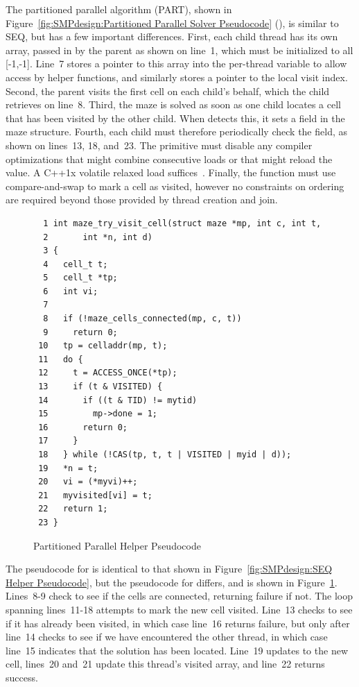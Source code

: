 The partitioned parallel algorithm (PART), shown in
Figure~\ref{fig:SMPdesign:Partitioned Parallel Solver Pseudocode}
(),
is similar to SEQ, but has a few important differences.
First, each child thread has its own  array, passed in by
the parent as shown on line~1,
which must be initialized to all [-1,-1].
Line~7 stores a pointer to this array into the per-thread variable
 to allow access by helper functions, and similarly stores
a pointer to the local visit index.
Second, the parent visits the first cell on each child's behalf,
which the child retrieves on line~8.
Third, the maze is solved as soon as one child locates a cell that has
been visited by the other child.
When  detects this,
it sets a  field in the maze structure.
Fourth, each child must therefore periodically check the 
field, as shown on lines~13, 18, and~23.
The  primitive must disable any compiler
optimizations that might combine consecutive loads or that
might reload the value.
A C++1x volatile relaxed load suffices~\cite{PeteBecker2011N3242}.
Finally, the  function must use
compare-and-swap to mark a cell as visited, however
no constraints on ordering are required beyond those provided by
thread creation and join.

\begin{figure}[tbp]
{ \scriptsize
\begin{verbatim}
  1 int maze_try_visit_cell(struct maze *mp, int c, int t,
  2       int *n, int d)
  3 {
  4   cell_t t;
  5   cell_t *tp;
  6   int vi;
  7 
  8   if (!maze_cells_connected(mp, c, t))
  9     return 0;
 10   tp = celladdr(mp, t);
 11   do {
 12     t = ACCESS_ONCE(*tp);
 13     if (t & VISITED) {
 14       if ((t & TID) != mytid)
 15         mp->done = 1;
 16       return 0;
 17     }
 18   } while (!CAS(tp, t, t | VISITED | myid | d));
 19   *n = t;
 20   vi = (*myvi)++;
 21   myvisited[vi] = t;
 22   return 1;
 23 }
\end{verbatim}
}
\caption{Partitioned Parallel Helper Pseudocode}
\label{fig:SMPdesign:Partitioned Parallel Helper Pseudocode}
\end{figure}

The pseudocode for  is identical to that shown in
Figure~\ref{fig:SMPdesign:SEQ Helper Pseudocode},
but the pseudocode for  differs, and
is shown in
Figure~\ref{fig:SMPdesign:Partitioned Parallel Helper Pseudocode}.
Lines~8-9 check to see if the cells are connected, returning failure
if not.
The loop spanning lines~11-18 attempts to mark the new cell visited.
Line~13 checks to see if it has already been visited, in which case
line~16 returns failure, but only after line~14 checks to see if
we have encountered the other thread, in which case line~15 indicates
that the solution has been located.
Line~19 updates to the new cell, lines~20 and~21 update this thread's visited
array, and line~22 returns success.

